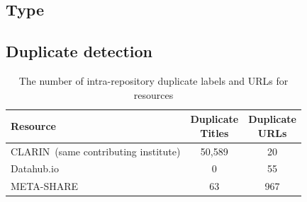 \documentclass[smallextended]{svjour3}       %
\begin{document}
\subsection{Type}

\subsection{Duplicate detection}

\begin{table}
    \begin{center}
    \begin{tabular}{l|cc}
        Resource   & \thead{Duplicate \\ Titles} & \thead{Duplicate \\ URLs} \\
        \hline                                                            
        CLARIN{\tiny~(same contributing institute)}     & 50,589           & 20          \\   
        Datahub.io & 0                & 55             \\
        META-SHARE & 63               & 967            \\
    \end{tabular}
    \end{center}
    \caption{\label{tab:self-dupes}The number of intra-repository duplicate labels and URLs for
    resources}
\end{table}
\end{document}

